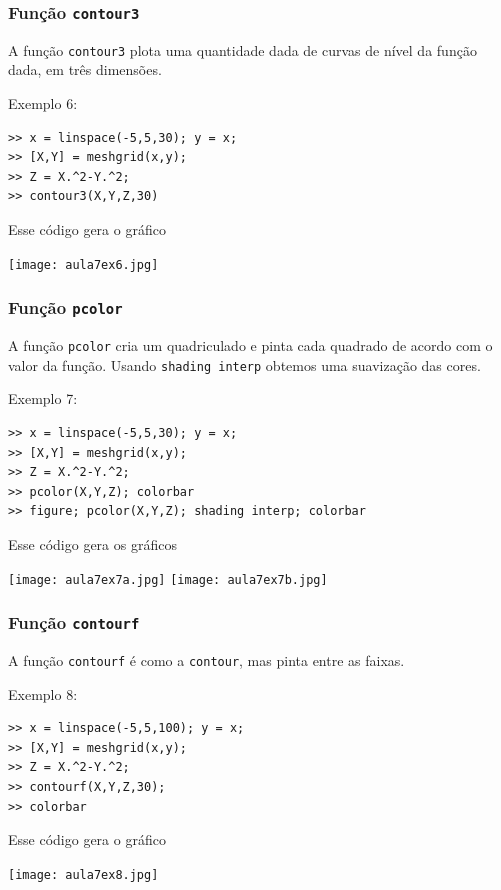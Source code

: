 \documentclass{beamer}
\begin{document}
\begin{frame}[fragile]
\frametitle{Fun\c{c}\~ao {\tt contour3}}
A fun\c{c}\~ao {\tt contour3} plota uma quantidade dada de curvas de n\'ivel da
fun\c{c}\~ao dada, em tr\^es dimens\~oes.

Exemplo 6:
{\scriptsize
\begin{verbatim}
>> x = linspace(-5,5,30); y = x;
>> [X,Y] = meshgrid(x,y);
>> Z = X.^2-Y.^2;
>> contour3(X,Y,Z,30)
\end{verbatim}}
\pause
Esse c\'odigo gera o gr\'afico
\begin{center}
\texttt{[image: aula7ex6.jpg]}
\end{center}
\end{frame}

\begin{frame}[fragile]
\frametitle{Fun\c{c}\~ao {\tt pcolor}}
A fun\c{c}\~ao {\tt pcolor} cria um quadriculado e pinta cada quadrado de acordo com o valor da fun\c{c}\~ao. Usando {\tt shading interp} obtemos uma suaviza\c{c}\~ao das cores.

Exemplo 7:
{\scriptsize
\begin{verbatim}
>> x = linspace(-5,5,30); y = x;
>> [X,Y] = meshgrid(x,y);
>> Z = X.^2-Y.^2;
>> pcolor(X,Y,Z); colorbar
>> figure; pcolor(X,Y,Z); shading interp; colorbar
\end{verbatim}}
\pause
Esse c\'odigo gera os gr\'aficos
\begin{center}
\texttt{[image: aula7ex7a.jpg]}
\texttt{[image: aula7ex7b.jpg]}
\end{center}
\end{frame}

\begin{frame}[fragile]
\frametitle{Fun\c{c}\~ao {\tt contourf}}
A fun\c{c}\~ao {\tt contourf} \'e como a {\tt contour}, mas pinta entre as
faixas.

Exemplo 8:
{\scriptsize
\begin{verbatim}
>> x = linspace(-5,5,100); y = x;
>> [X,Y] = meshgrid(x,y);
>> Z = X.^2-Y.^2;
>> contourf(X,Y,Z,30);
>> colorbar
\end{verbatim}}
\pause
Esse c\'odigo gera o gr\'afico
\begin{center}
\texttt{[image: aula7ex8.jpg]}
\end{center}
\end{frame}

\section[Exerc\'icios]{}
\end{document}
